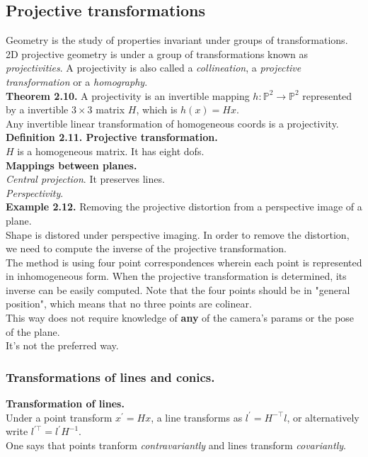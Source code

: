 \documentclass[12pt]{article}
\begin{document}
\subsection{Projective transformations}
Geometry is the study of properties invariant under groups of transformations. \\
2D projective geometry is under a group of transformations known as \textit{projectivities}.
A projectivity is also called a \textit{collineation}, a \textit{projective transformation} 
or a \textit{homography}. \\

\noindent \textbf{Theorem 2.10.} A projectivity is an invertible mapping $h : \mathbb{P}^2 \rightarrow \mathbb{P}^2$
represented by a invertible $3 \times 3$ matrix $H$, which is $h(x) = Hx$. \\
Any invertible linear transformation of homogeneous coords is a projectivity. \\

\noindent \textbf{Definition 2.11. Projective transformation.} \\
$H$ is a homogeneous matrix. It has eight dofs. \\

\noindent \textbf{Mappings between planes.} \\
\textit{Central projection}. It preserves lines. \\
\textit{Perspectivity}. \\

\noindent \textbf{Example 2.12.} Removing the projective distortion from a perspective image of a plane. \\
Shape is distored under perspective imaging. In order to remove the distortion, we need to 
compute the inverse of the projective transformation. \\
The method is using four point correspondences wherein each point is represented in inhomogeneous form. When the 
projective transformation is determined, its inverse can be easily computed. Note that the four points should be 
in "general position", which means that no three points are colinear. \\
This way does not require knowledge of \textbf{any} of the camera's params or the pose of the plane. \\
It's not the preferred way. 

\subsubsection{Transformations of lines and conics.} 
\textbf{Transformation of lines.} \\
Under a point transform $x^\prime = Hx$, a line transforms as $l^\prime = H^{-\top} l$, or alternatively write $l^{\prime \top} = l^\prime H^{-1}$. \\
One says that points tranform \textit{contravariantly} and lines transform \textit{covariantly}. \\
\end{document}
